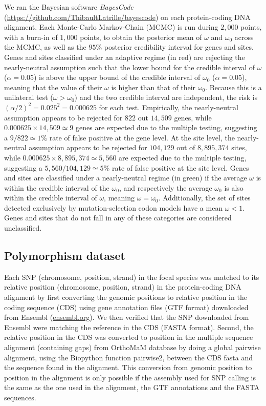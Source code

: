 \documentclass{article}
\begin{document}
    We ran the Bayesian software \textit{BayesCode} (\url{https://github.com/ThibaultLatrille/bayescode}) on each protein-coding DNA alignment\cite{rodrigue_bayesian_2021}.
    Each Monte-Carlo Markov-Chain (MCMC) is run during $2,000$ points, with a burn-in of $1,000$ points, to obtain the posterior mean of $\omega$ and $\omega_{0}$ across the MCMC, as well as the $95$\% posterior credibility interval for genes and sites.
    Genes and sites classified under an adaptive regime (in red) are rejecting the nearly-neutral assumption such that the lower bound for the credible interval of $\omega$ ($\alpha=0.05$) is above the upper bound of the credible interval of $\omega_{0}$ ($\alpha=0.05$), meaning that the value of their $\omega$ is higher than that of their $\omega_{0}$.
    Because this is a unilateral test ($\omega > \omega_{0}$) and the two credible interval are independent, the risk is $(\alpha/2)^2=0.025^2=0.000625$ for each test.
    Empirically, the nearly-neutral assumption appears to be rejected for $822$ out $14,509$ genes, while $0.000625 \times 14,509 \simeq 9$ genes are expected due to the multiple testing, suggesting a $9 / 822 \simeq 1\%$ rate of false positive at the gene level.
    At the site level, the nearly-neutral assumption appears to be rejected for $104,129$ out of $8,895,374$ sites, while $0.000625 \times 8,895,374 \simeq 5,560$ are expected due to the multiple testing, suggesting a $5,560 / 104,129 \simeq 5\%$ rate of false positive at the site level.
    Genes and sites are classified under a nearly-neutral regime (in green) if the average $\omega$ is within the credible interval of the $\omega_{0}$, and respectively the average $\omega_{0}$ is also within the credible interval of  $\omega$, meaning $\omega = \omega_{0}$.
    Additionally, the set of sites detected exclusively by mutation-selection codon models have a mean $\omega < 1 $.
    Genes and sites that do not fall in any of these categories are considered unclassified.

    \subsection*{Polymorphism dataset}

    Each SNP (chromosome, position, strand) in the focal species was matched to its relative position (chromosome, position, strand) in the protein-coding DNA alignment by first converting the genomic positions to relative position in the coding sequence (CDS) using gene annotation files (GTF format) downloaded from Ensembl (\url{ensembl.org}).
    We then verified that the SNP downloaded from Ensembl were matching the reference in the CDS (FASTA format).
    Second, the relative position in the CDS was converted to position in the multiple sequence alignment (containing gaps) from OrthoMaM database\cite{ranwez_orthomam_2007, douzery_orthomam_2014, scornavacca_orthomam_2019} by doing a global pairwise alignment, using the Biopython function pairwise2, between the CDS fasta and the sequence found in the alignment.
    This conversion from genomic position to position in the alignment is only possible if the assembly used for SNP calling is the same as the one used in the alignment, the GTF annotations and the FASTA sequences.
\end{document}
